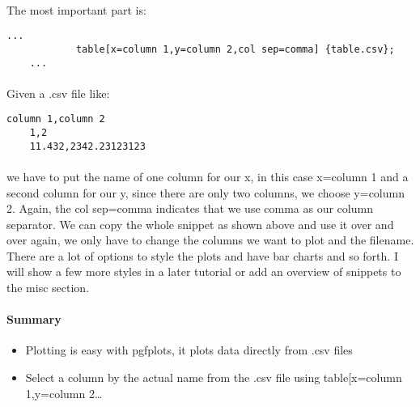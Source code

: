   \paragraph{}
  The most important part is:
  \begin{lstlisting}[language={[LaTeX]TeX},breaklines=true,frame=single]
    ...
            table[x=column 1,y=column 2,col sep=comma] {table.csv};
    ...
  \end{lstlisting}
  \paragraph{}
  Given a .csv file like:
  \begin{lstlisting}[language={[LaTeX]TeX},breaklines=true,frame=single]
    column 1,column 2
    1,2
    11.432,2342.23123123
  \end{lstlisting}

  \paragraph{}
  we have to put the name of one column for our x, in this case x=column 1 and a second column for our y, since there are only two columns, we choose y=column 2. Again, the col sep=comma indicates that we use comma as our column separator. We can copy the whole snippet as shown above and use it over and over again, we only have to change the columns we want to plot and the filename. There are a lot of options to style the plots and have bar charts and so forth. I will show a few more styles in a later tutorial or add an overview of snippets to the misc section.

  \paragraph{Summary}
    \begin{itemize} %
      \item Plotting is easy with pgfplots, it plots data directly from .csv files
      \item Select a column by the actual name from the .csv file using table[x=column 1,y=column 2…
    \end{itemize} 
